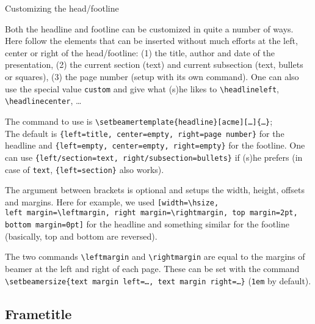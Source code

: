 \documentclass[9pt]{beamer}
\def\com#1{\texttt{\textbackslash #1}}
\let\command\com
\def\sharp#1{{\usebeamer{structure}(\scshape#1)}}
\begin{document}
\begin{frame}
  {Customizing the head/footline}

  Both the headline and footline can be customized in quite a number of
  ways. Here follow the elements that can be inserted without much
  efforts at the left, center or right of the head/footline:
  \sharp1 the title, author and date of the presentation,
  \sharp2 the current section (text) and current subsection (text,
  bullets or squares),
  \sharp3 the page number (setup with its own command).
  One can also use the special value \texttt{custom} and give what (s)he
  likes to \command{headlineleft}, \command{headlinecenter}, \dots

  The command to use is
  \command{setbeamertemplate\{headline\}[acme][\dots]\{\dots\}};\\
  The default is
  \texttt{\{left=title, center=empty, right=page number\}} for the
  headline and
  \texttt{\{left=empty, center=empty, right=empty\}} for the footline.
  One can use \texttt{\{left/section=text, right/subsection=bullets\}}
  if (s)he prefers (in case of \texttt{text}, \texttt{\{left=section\}}
  also works).

  The argument between brackets is optional and setups the width,
  height, offsets and margins. Here for example, we used
  \texttt{[width=\textbackslash hsize, %
    left~margin=\textbackslash leftmargin, %
    right~margin=\textbackslash rightmargin, %
    top~margin=2pt, bottom~margin=0pt]} %
  for the headline and something similar for the footline (basically,
  top and bottom are reversed).

  The two commands \command{leftmargin} and \command{rightmargin} are
  equal to the margins of beamer at the left and right of each page.
  These can be set with the command\\
  \command{setbeamersize\{text~margin~left=\dots,
    text~margin~right=\dots\}} (\texttt{1em} by default).

\end{frame}


\subsection{Frametitle}
\end{document}
